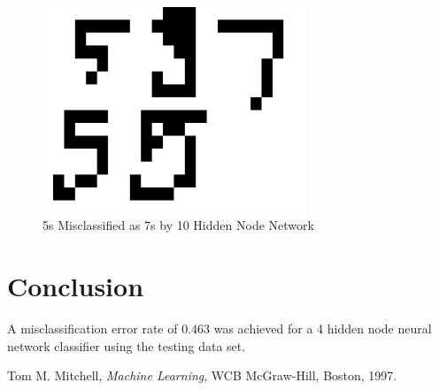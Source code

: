 \documentclass{article}
\begin{document}
\begin{figure}
\centering
\includegraphics[width=0.7\textwidth]{data/final/10_test_5missclass7.png}
\caption{5s Misclassified as 7s by 10 Hidden Node Network}
\label{10_5missclass7}
\end{figure}

\section{Conclusion}\label{conclusion}

A misclassification error rate of \(0.463\) was achieved for a 4 hidden node neural network classifier using the testing data set.

\begin{thebibliography}{9}

  Tom M. Mitchell,
  \emph{Machine Learning},
  WCB McGraw-Hill, Boston,
  1997.

\end{thebibliography}
\end{document}
